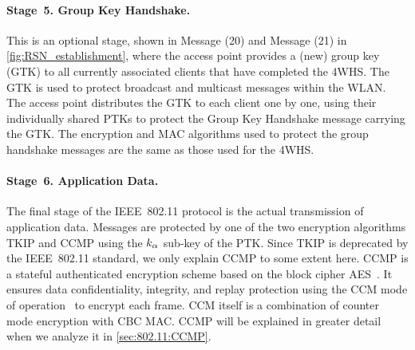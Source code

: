   


\paragraph{Stage~5. Group Key Handshake.}
This is an optional stage,
shown in Message (20) and Message (21) in \cref{fig:RSN_establishment},
where the access point provides a (new) group key (GTK) to all currently associated clients that have completed the 4WHS. 
The GTK is used to protect broadcast and multicast messages within the WLAN.
The access point distributes the GTK to each client one by one,
using their individually shared PTKs to protect the Group Key Handshake message carrying the GTK.
The encryption and MAC algorithms used to protect the group handshake messages are the same as those used for the 4WHS.





\paragraph{Stage~6. Application Data.}
The final stage of the IEEE~802.11 protocol is the actual transmission of application data.
Messages are protected by one of the two encryption algorithms TKIP and CCMP using the $k_\alpha$ sub-key of the PTK.
Since TKIP is deprecated by the IEEE~802.11 standard,
we only explain CCMP to some extent here.
CCMP is a stateful authenticated encryption scheme based on the block cipher AES~\cite{FIPS:197-2001:AES}.
It ensures data confidentiality, integrity, and replay protection
using the CCM mode of operation~\cite{IETF:RFC3610:CCM} to encrypt each frame.
CCM itself is a combination of counter mode encryption with CBC MAC.
CCMP will be explained in greater detail when we analyze it in \cref{sec:802.11:CCMP}.




